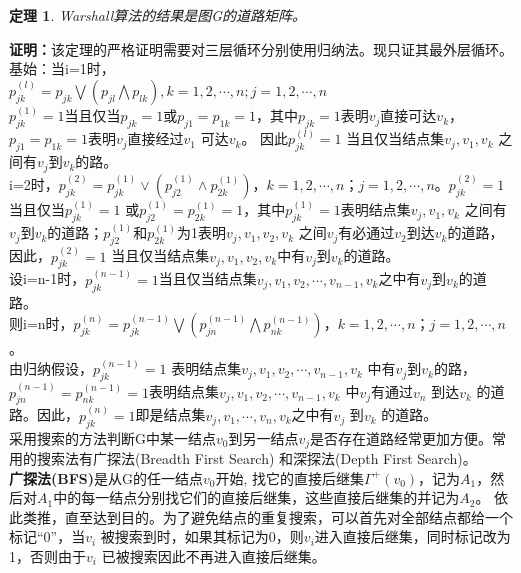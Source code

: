 \documentclass[11pt,a4paper,openany]{book}
\newtheorem{theorem}{\textbf{定理}}[section]
\begin{document}
\begin{theorem}\K Warshall算法的结果是图G的道路矩阵。
\end{theorem}
\textbf{证明：}该定理的严格证明需要对三层循环分别使用归纳法。现只证其最外层循环。\\
基始：当i=1时，\\
$p_{jk}^{(l)}=p_{jk}\bigvee (p_{jl}\bigwedge p_{lk}),k=1,2,\cdots,n;j=1,2,\cdots,n$\\
$p_{jk}^{(1)}=1$当且仅当$p_{jk}=1$或$p_{j1}=p_{1k}=1$，其中$p_{jk}=1$表明$v_j$直接可达$v_k$，$p_{j1}=p_{1k}=1$表明$v_j$直接经过$v_1$ 可达$v_k$。 因此$p_{jk}^{(l) }=1$ 当且仅当结点集{$v_j,v_1,v_k$ } 之间有$v_j$到$v_k$的路。\\
 \indent i=2时，$p_{jk}^{(2)}=p_{jk}^{(1)}∨(p_{j2}^{(1)}∧p_{2k}^{(1)})$，$k=1,2,\cdots,n$；$j=1,2,\cdots,n$。$p_{jk}^{(2)}=1$当且仅当$p_{jk}^{(1)}=1$ 或$ p_{j2}^{(1)}=p_{2k}^{(1)} =1$，其中$p_{jk}^{(1)}=1$表明结点集{$v_j,v_1,v_k$ }之间有$v_j$到$v_k$的道路；$p_{j2}^{(1)} $和$p_{2k}^{(1)}$为1表明{$v_j,v_1,v_2,v_k $} 之间$v_j$有必通过$v_2$到达$v_k$的道路，因此，$p_{jk}^{(2)}=1$ 当且仅当结点集{$v_j,v_1,v_2,v_k $}中有$v_j$到$v_k$的道路。\\
\indent 设i=n-1时，$p_{jk}^{(n-1)}=1$当且仅当结点集{$v_j,v_1,v_2,\cdots,v_{n-1},v_k$}之中有$v_j$到$v_k$的道路。\\
\indent 则i=n时，$p_{jk}^{(n)}=p_{jk}^{(n-1)}\bigvee(p_{jn}^{(n-1)}\bigwedge p_{nk}^{(n-1)})，k=1,2,\cdots,n；j=1,2,\cdots,n$。\\由归纳假设，$p_{jk}^{(n-1)}=1 $ 表明结点集{$v_j,v_1,v_2,\cdots,v_{n-1},v_k$ }中有$v_j$到$v_k$的路，$p_{jn}^{(n-1)}=p_{nk}^{(n-1)}=1$表明结点集{$v_j,v_1,v_2,\cdots,v_{n-1},v_k$ }中$v_j$有通过$v_n$ 到达$v_k$ 的道路。因此，$p_{jk}^{(n)}=1$即是结点集{$v_j,v_1,\cdots,v_n,v_k $}之中有$v_j$ 到$v_k$ 的道路。\\
\indent 采用搜索的方法判断G中某一结点$v_0$到另一结点$v_j$是否存在道路经常更加方便。常用的搜索法有广探法(Breadth First Search) 和深探法(Depth First Search)。
\\ \indent \textbf{广探法(BFS)}是从G的任一结点$v_0$开始, 找它的直接后继集$Γ^+ (v_0)$，记为$A_1$，然后对$A_1$中的每一结点分别找它们的直接后继集，这些直接后继集的并记为$A_2$。 依此类推，直至达到目的。为了避免结点的重复搜索，可以首先对全部结点都给一个标记“0”，当$v_i$ 被搜索到时，如果其标记为0，则$v_i$进入直接后继集，同时标记改为1，否则由于$v_i$ 已被搜索因此不再进入直接后继集。
\end{document}
